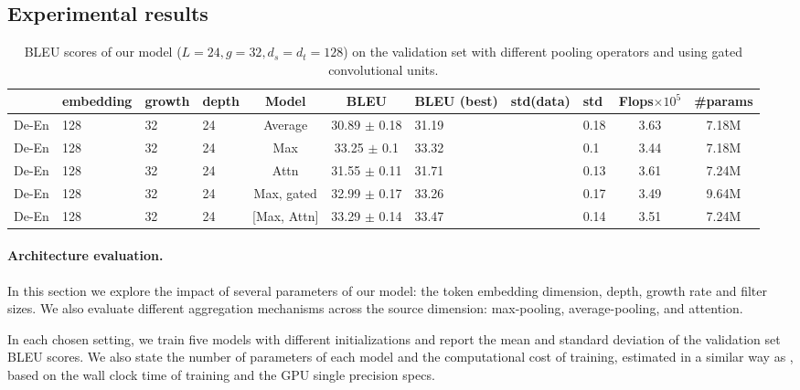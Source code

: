 \documentclass[11pt,a4paper]{article}
\begin{document}
\subsection{Experimental results}


\begin{table}
\begin{center}
{\small
\begin{tabular}{HHHHccHHHcc}
\toprule
              & embedding & growth  & depth & Model      & BLEU                & BLEU (best) & std(data) &  std  & Flops$\times10^5$ & \#params\\ 
\midrule
De-En         &    128    & 32      & 24    & Average    &  30.89 $ \pm$ 0.18  &    31.19    &           &  0.18 &     3.63    & 7.18M \\
De-En         &    128    & 32      & 24    & Max        &  33.25 $ \pm$ 0.1   &    33.32    &           &  0.1  &     3.44    & 7.18M \\ 
De-En         &    128    & 32      & 24    & Attn       &  31.55 $\pm$ 0.11   &    31.71    &           &  0.13 &     3.61    & 7.24M \\
De-En         &    128    & 32      & 24    & Max, gated &  32.99 $\pm$ 0.17   &    33.26    &           &  0.17 &     3.49    & 9.64M \\
De-En         &    128    & 32      & 24    & [Max, Attn]&  33.29 $\pm$ 0.14   &    33.47    &           &  0.14 &     3.51    & 7.24M \\
\bottomrule
\end{tabular}
}
\end{center}
\caption{BLEU scores of our model ($L\!=\!24, g\!=\!32, d_s\!=\!d_t\!=\!128$) on the validation set with different pooling operators and using gated convolutional units.}
\label{tab:ablation}
\end{table}

 
\paragraph{Architecture evaluation.}
In this section we explore the impact of several parameters of our model:  the  token embedding dimension, depth, growth rate and filter sizes. We also evaluate different aggregation mechanisms across the source dimension: max-pooling, average-pooling, and  attention.

In each chosen setting, we train five models with different initializations and report the mean and standard deviation of the validation set BLEU scores. We also state the number of parameters of each model and the computational cost of training, estimated in a similar way as  \citet{vaswani17nips}, based on the wall clock time of training and the GPU single precision specs.
\end{document}
